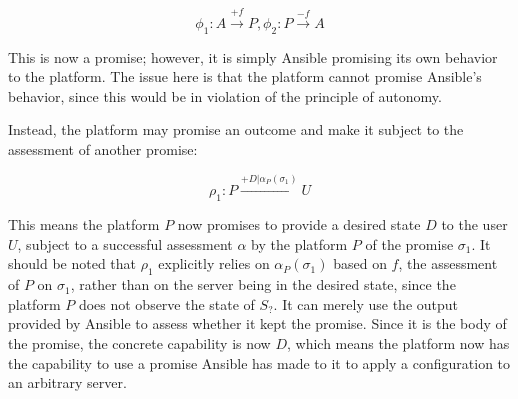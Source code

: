 \[ \phi _1: A \xrightarrow{+f} P, \phi _2: P \xrightarrow{-f} A \]

This is now a promise; however, it is simply Ansible promising its own behavior to the platform.
The issue here is that the platform cannot promise Ansible's behavior, since this would be in violation of the principle of autonomy.
\parencite{promise-theory}
\par
Instead, the platform may promise an outcome and make it subject to the assessment of another promise:

\[ \rho _1: P \xrightarrow{+D|\alpha _P(\sigma _1)} U \]

This means the platform $P$ now promises to provide a desired state $D$ to the user $U$, subject to a successful assessment $\alpha$ by the platform $P$ of the promise $\sigma _1$.
It should be noted that $\rho _1$ explicitly relies on $\alpha _P(\sigma _1)$ based on $f$, the assessment of $P$ on $\sigma _1$, rather than on the server being in the desired state, since the platform $P$ does not observe the state of $S_?
$.
It can merely use the output provided by Ansible to assess whether it kept the promise.
Since it is the body of the promise, the concrete capability is now $D$, which means the platform now has the capability to use a promise Ansible has made to it to apply a configuration to an arbitrary server.
\parencite{promise-theory}
